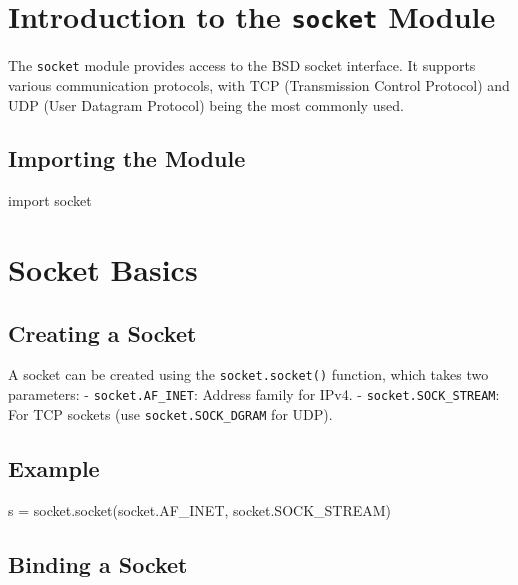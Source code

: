 \documentclass[
  letterpaper,
  DIV=11,
  numbers=noendperiod]{scrreprt}
\newenvironment{Shaded}{\begin{snugshade}}{\end{snugshade}}
\newcommand{\ImportTok}[1]{\textcolor[rgb]{0.00,0.46,0.62}{#1}}
\newcommand{\NormalTok}[1]{\textcolor[rgb]{0.00,0.23,0.31}{#1}}
\newcommand{\OperatorTok}[1]{\textcolor[rgb]{0.37,0.37,0.37}{#1}}
\begin{document}
\section{\texorpdfstring{Introduction to the \texttt{socket}
Module}{Introduction to the socket Module}}\label{introduction-to-the-socket-module}

The \texttt{socket} module provides access to the BSD socket interface.
It supports various communication protocols, with TCP (Transmission
Control Protocol) and UDP (User Datagram Protocol) being the most
commonly used.

\subsection{Importing the Module}\label{importing-the-module}

\begin{Shaded}
\begin{Highlighting}[]
\ImportTok{import}\NormalTok{ socket}
\end{Highlighting}
\end{Shaded}

\section{Socket Basics}\label{socket-basics}

\subsection{Creating a Socket}\label{creating-a-socket-1}

A socket can be created using the \texttt{socket.socket()} function,
which takes two parameters: - \texttt{socket.AF\_INET}: Address family
for IPv4. - \texttt{socket.SOCK\_STREAM}: For TCP sockets (use
\texttt{socket.SOCK\_DGRAM} for UDP).

\subsection{Example}\label{example-29}

\begin{Shaded}
\begin{Highlighting}[]
\NormalTok{s }\OperatorTok{=}\NormalTok{ socket.socket(socket.AF\_INET, socket.SOCK\_STREAM)}
\end{Highlighting}
\end{Shaded}

\subsection{Binding a Socket}\label{binding-a-socket}
\end{document}
